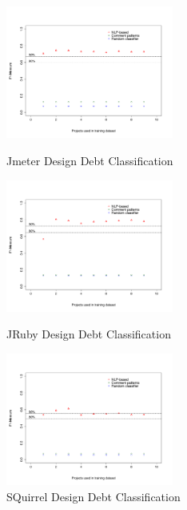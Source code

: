 \clearpage
\begin{figure}[thb!]
  \centering
  \includegraphics[width=0.49\textwidth]{figures/appendix/iteration_details/design_jmeter.pdf}
  \caption{Jmeter Design Debt Classification}
  \label{fig:design_jmeter}
  \includegraphics[width=0.49\textwidth]{figures/appendix/iteration_details/design_jruby.pdf}
   \caption{JRuby Design Debt Classification}
   \label{fig:design_jruby}
   \centering
   \includegraphics[width=0.49\textwidth]{figures/appendix/iteration_details/design_sql12.pdf}
   \caption{SQuirrel Design Debt Classification}
   \label{fig:design_sql}
\end{figure}
 
